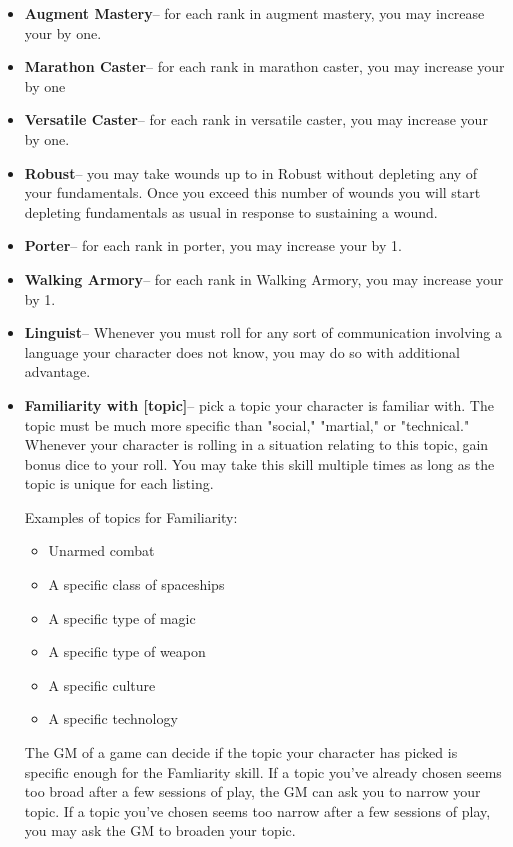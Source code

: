 \begin{GRPquicknotewide}
\begin{itemize}
	\item \textbf{Augment Mastery}-- for each rank in augment mastery, you may increase your  by one.
	\item \textbf{Marathon Caster}-- for each rank in marathon caster, you may increase your  by one
	\item \textbf{Versatile Caster}-- for each rank in versatile caster, you may increase your  by one.
	\item \textbf{Robust}-- you may take wounds up to  in Robust without depleting any of your fundamentals. Once you exceed this number of wounds you will start depleting fundamentals as usual in response to sustaining a wound.
	\item \textbf{Porter}-- for each rank in porter, you may increase your  by 1.
	\item \textbf{Walking Armory}-- for each rank in Walking Armory, you may increase your  by 1.
	\item \textbf{Linguist}-- Whenever you must roll for any sort of communication involving a language your character does not know, you may do so with  additional advantage.
	\item \textbf{Familiarity with [topic]}-- pick a topic your character is familiar with. The topic must be much more specific than "social," "martial," or "technical." Whenever your character is rolling in a situation relating to this topic, gain  bonus dice to your roll. You may take this skill multiple times as long as the topic is unique for each listing.

	Examples of topics for Familiarity:
	\begin{itemize}
		\item Unarmed combat
		\item A specific class of spaceships
		\item A specific type of magic
		\item A specific type of weapon
		\item A specific culture
		\item A specific technology
	\end{itemize}

	The GM of a game can decide if the topic your character has picked is specific enough for the Famliarity skill. If a topic you've already chosen seems too broad after a few sessions of play, the GM can ask you to narrow your topic. If a topic you've chosen seems too narrow after a few sessions of play, you may ask the GM to broaden your topic.
\end{itemize}
\end{GRPquicknotewide}

